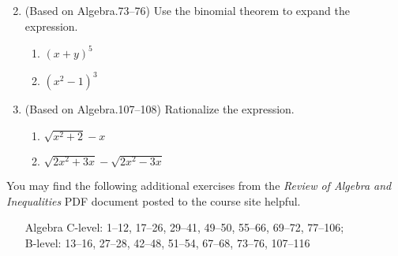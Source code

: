\documentclass[11pt]{article}
\newcommand{\ds}{\displaystyle}
\begin{document}
\begin{enumerate}
\begin{multicols}{2}
\begin{enumerate}
  \end{enumerate}
  \end{multicols}
\item (Based on Algebra.73--76) Use the binomial theorem to expand
  the expression. %
  \begin{multicols}{2}
  \begin{enumerate}
  \item $\ds (x+y)^5$
  \item $\ds (x^2-1)^3$
  \end{enumerate}
  \end{multicols}
\item (Based on Algebra.107--108) Rationalize the expression. %
  \begin{multicols}{2}
  \begin{enumerate}
  \item $\ds \sqrt{x^2+2}-x$
  \item $\ds \sqrt{2x^2+3x}-\sqrt{2x^2-3x}$
  \end{enumerate}
  \end{multicols}
\end{enumerate}

\noindent
You may find the following additional exercises from the \emph{Review
  of Algebra and Inequalities} PDF document posted to the course site
helpful.
\begin{itemize}
\item[Algebra] 
  C-level: 1--12, 17--26, 29--41, 49--50, 55--66, 69--72, 77--106; \\
  B-level: 13--16, 27--28, 42--48, 51--54, 67--68, 73--76, 107--116
\end{itemize}
\end{document}
